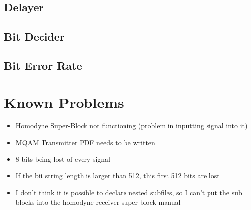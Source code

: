 \documentclass[a4paper]{article}
\begin{document}
\subsection{Delayer}


\subsection{Bit Decider}


\subsection{Bit Error Rate}


\section{Known Problems}

\begin{itemize}
\item Homodyne Super-Block not functioning (problem in inputting signal into it)
\item MQAM Transmitter PDF needs to be written
\item 8 bits being lost of every signal
\item If the bit string length is larger than 512, this first 512 bits are lost
\item I don't think it is possible to declare nested subfiles, so I can't put the sub blocks into the homodyne receiver super block manual
\end{itemize}
\end{document}
